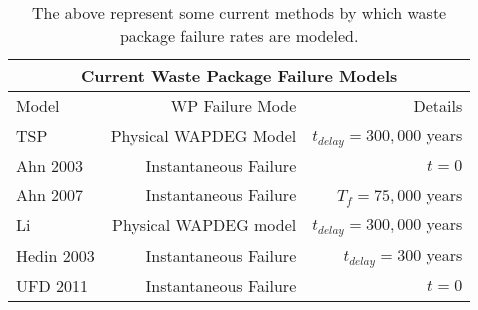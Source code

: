 \begin{table}[h!]
\centering
\footnotesize{
\begin{tabular}[h!bt]{|l|r|r|}
  \multicolumn{3}{c}{\textbf{Current Waste Package Failure Models}}\\
  \hline
  Model&WP Failure Mode&Details\\
  \hline
  TSP&Physical WAPDEG Model&$t_{delay}=300,000$ years\\
  \hline
  Ahn 2003&Instantaneous Failure&$t=0$\\
  \hline
  Ahn 2007&Instantaneous Failure&$T_f=75,000$ years\\
  \hline
  Li&Physical WAPDEG model&$t_{delay}=300,000$ years\\
  \hline
  Hedin 2003& Instantaneous Failure & $t_{delay} = 300$ years \\
  \hline
  UFD 2011&Instantaneous Failure&$t=0$\\
  \hline
\end{tabular}
\label{tab:wpfail}
\caption[Current WP Failure Models]{The above represent some current methods by which 
waste package failure rates are modeled.}
}
\end{table}

